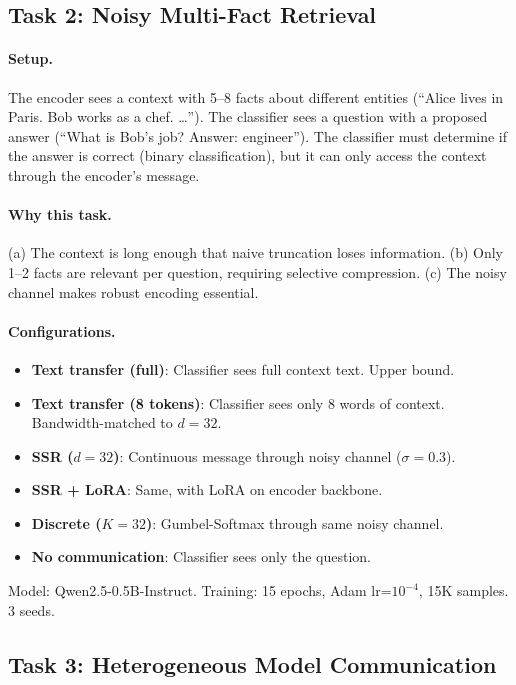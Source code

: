 \documentclass[11pt,a4paper]{article}
\begin{document}
\subsection{Task 2: Noisy Multi-Fact Retrieval}

\paragraph{Setup.} The encoder sees a context with 5--8 facts about different entities (``Alice lives in Paris. Bob works as a chef. \ldots''). The classifier sees a question with a proposed answer (``What is Bob's job? Answer: engineer''). The classifier must determine if the answer is correct (binary classification), but it can only access the context through the encoder's message.

\paragraph{Why this task.} (a) The context is long enough that naive truncation loses information. (b) Only 1--2 facts are relevant per question, requiring selective compression. (c) The noisy channel makes robust encoding essential.

\paragraph{Configurations.}
\begin{itemize}[nosep]
    \item \textbf{Text transfer (full)}: Classifier sees full context text. Upper bound.
    \item \textbf{Text transfer (8 tokens)}: Classifier sees only 8 words of context. Bandwidth-matched to $d{=}32$.
    \item \textbf{SSR ($d{=}32$)}: Continuous message through noisy channel ($\sigma{=}0.3$).
    \item \textbf{SSR + LoRA}: Same, with LoRA on encoder backbone.
    \item \textbf{Discrete ($K{=}32$)}: Gumbel-Softmax through same noisy channel.
    \item \textbf{No communication}: Classifier sees only the question.
\end{itemize}

Model: Qwen2.5-0.5B-Instruct. Training: 15 epochs, Adam lr=$10^{-4}$, 15K samples. 3 seeds.

\subsection{Task 3: Heterogeneous Model Communication}
\end{document}
